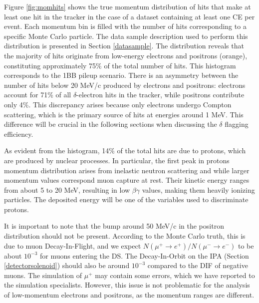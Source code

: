 Figure \ref{fig:momhits} shows the true momentum distribution of 
hits that make at least one hit in the tracker in the case of a 
dataset containing at least one CE per event. Each momentum bin is filled with 
the number of hits corresponding to a specific Monte Carlo particle. 
The data sample description used to perform this distribution 
is presented in Section \ref{datasample}.
The distribution reveals that the majority of hits originate from 
low-energy electrons and positrons (orange), constituting approximately 
75\% of the total number of hits. This histogram corresponds to 
the 1BB pileup scenario. 
There is an asymmetry between the number of hits below 20 MeV/c 
produced by electrons and positrons: electrons account for 
71\% of all $\delta$-electron hits in the tracker, while positrons 
contribute only 4\%. This discrepancy arises because only electrons 
undergo Compton scattering, which is the primary source of hits at 
energies around 1 MeV. This difference will be crucial in 
the following sections when discussing the $\delta$ flagging efficiency.

As evident from the histogram, 14\% of the total hits are due to protons, 
which are produced by nuclear processes. 
In particular, the first peak in protons momentum distribution arises from 
inelastic neutron scattering and while larger momentum values correspond muon capture at rest.
Their kinetic energy ranges from about 5 to 20 MeV, resulting in low $\beta \gamma$ values, 
making them heavily ionizing particles. The deposited energy will be 
one of the variables used to discriminate protons. 

It is important to note that the bump around 50 MeV/c in 
the positron distribution should not be present. According 
to the Monte Carlo truth, this is due to muon Decay-In-Flight, 
and we expect $N(\mu^+ \rightarrow e^+ )/N(\mu^- \rightarrow e^- )$ to be about $10^{-3}$ 
for muons entering the DS. The Decay-In-Orbit on the IPA 
(Section \ref{detectorsolenoid}) should also be around 
$10^{-3}$ compared to the DIF of negative muons. 
The simulation of $\mu^+$ may contain some errors, 
which we have reported to the simulation specialists. 
However, this issue is not problematic for the analysis 
of low-momentum electrons and positrons, as the momentum ranges are different.

